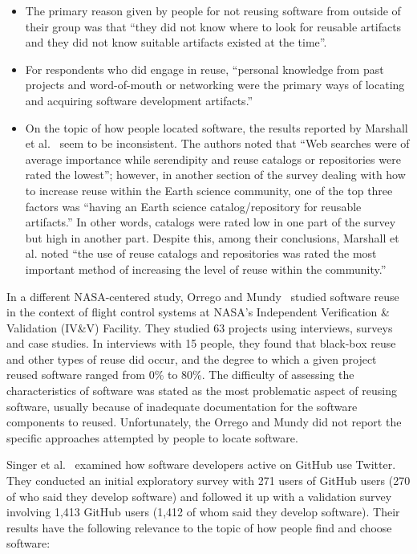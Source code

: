 \documentclass{casicswhitepaper}
\begin{document}
\begin{itemize}

\item The primary reason given by people for not reusing software from outside of their group was that ``they did not know where to look for reusable artifacts and they did not know suitable artifacts existed at the time''.

\item For respondents who did engage in reuse, ``personal knowledge from past projects and word-of-mouth or networking were the primary ways of locating and acquiring software development artifacts.''  

\item On the topic of how people located software, the results reported by Marshall et al.~\cite{marshall2006software} seem to be inconsistent.  The authors noted that ``Web searches were of average importance while serendipity and reuse catalogs or repositories were rated the lowest''; however, in another section of the survey dealing with how to increase reuse within the Earth science community, one of the top three factors was ``having an Earth science catalog/repository for reusable artifacts.''  In other words, catalogs were rated low in one part of the survey but high in another part.  Despite this, among their conclusions, Marshall et al. noted ``the use of reuse catalogs and repositories was rated the most important method of increasing the level of reuse within the community.''

\end{itemize}

In a different NASA-centered study, Orrego and Mundy~\cite{orrego_2007_study} studied software reuse in the context of flight control systems at NASA's Independent Verification \& Validation (IV\&V) Facility.  They studied 63 projects using interviews, surveys and case studies.  In interviews with 15 people, they found that black-box reuse and other types of reuse did occur, and the degree to which a given project reused software ranged from 0\% to 80\%.  The difficulty of assessing the characteristics of software was stated as the most problematic aspect of reusing software, usually because of inadequate documentation for the software components to reused.  Unfortunately, the Orrego and Mundy did not report the specific approaches attempted by people to locate software.

Singer et al.~\cite{singer2014software} examined how software developers active on GitHub use Twitter.  They conducted an initial exploratory survey with 271 users of GitHub users (270 of who said they develop software) and followed it up with a validation survey involving 1,413 GitHub users (1,412 of whom said they develop software).  Their results have the following relevance to the topic of how people find and choose software:
\end{document}
